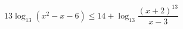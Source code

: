\begin{ex}[type=inequality]
	\begin{condition}
		\( 13\log_{13}(x^2-x-6)\le14+\log_{13}\dfrac{(x+2)^{13}}{x-3} \)
	\end{condition}
	\answer{\( (-10;-2]\cup(3;16] \)}
\end{ex}